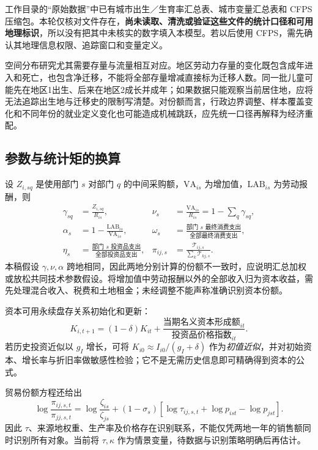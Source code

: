 \documentclass[UTF8,a4paper,zihao=-4,fontset=windows]{ctexart}
\numberwithin{equation}{section}
\begin{document}
工作目录的“原始数据”中已有城市出生／生育率汇总表、城市变量汇总表和 CFPS 压缩包。本轮仅核对文件存在，\textbf{尚未读取、清洗或验证这些文件的统计口径和可用地理标识}，所以没有把其中未核实的数字填入本模型。若以后使用 CFPS，需先确认其地理信息权限、追踪窗口和变量定义。

空间分布研究尤其需要存量与流量相互对应。地区劳动力存量的变化既包含成年进入和死亡，也包含净迁移，不能将全部存量增减直接标为迁移人数。同一批儿童可能先在地区1出生、后来在地区2成长并成年；如果数据只能观察当前居住地，应将无法追踪出生地与迁移史的限制写清楚。对份额而言，行政边界调整、样本覆盖变化和不同年份的就业定义变化也可能造成机械跳跃，应先统一口径再解释为经济重配。

\subsection{参数与统计矩的换算}
设 $Z_{i,sq}$ 是使用部门 $s$ 对部门 $q$ 的中间采购额，$\mathrm{VA}_{is}$ 为增加值，$\mathrm{LAB}_{is}$ 为劳动报酬，则
\begin{align}
 \gamma_{sq}&=\frac{Z_{i,sq}}{R_{is}},&
 \nu_s&=\frac{\mathrm{VA}_{is}}{R_{is}}
 =1-\sum_q\gamma_{sq},\\
 \alpha_s&=1-\frac{\mathrm{LAB}_{is}}{\mathrm{VA}_{is}},&
 \omega_s&=\frac{\text{部门 }s\text{ 最终消费支出}}{\text{全部最终消费支出}},\\
 \eta_s&=\frac{\text{部门 }s\text{ 投资品支出}}{\text{全部投资品支出}},&
 \pi_{ij,s}&=\frac{\mathcal T_{ij,s}}{\sum_k\mathcal T_{kj,s}}.
 \label{eq:calibration}
\end{align}
本稿假设 $\gamma,\nu,\alpha$ 跨地相同，因此两地分别计算的份额不一致时，应说明汇总加权或放松共同技术参数假设。将增加值中劳动报酬以外的全部收入归为资本收益，需先处理混合收入、税费和土地租金；未经调整不能声称准确识别资本份额。

资本可用永续盘存关系初始化和更新：
\begin{equation}
 K_{i,t+1}=(1-\delta)K_{it}
 +\frac{\text{当期名义资本形成额}_{it}}{\text{投资品价格指数}_{it}}.
\end{equation}
若历史投资近似以 $g_I$ 增长，可将 $K_{i0}\approx I_{i0}/(g_I+\delta)$ 作为\emph{初值近似}，并对初始资本、增长率与折旧率做敏感性检验；它不是无需历史信息即可精确得到资本的公式。

贸易份额方程还给出
\begin{equation}
 \log\frac{\pi_{ij,s,t}}{\pi_{jj,s,t}}
 =\log\frac{\zeta_{is}}{\zeta_{js}}
 +(1-\sigma_s)\left[\log\tau_{ij,s,t}+\log p_{ist}-\log p_{jst}\right].
 \label{eq:trade-identification}
\end{equation}
因此 $\tau$、来源地权重、生产率及价格存在识别联系，不能仅凭两地一年的销售额同时识别所有对象。当前将 $\tau,\kappa$ 作为情景变量，待数据与识别策略明确后再估计。
\end{document}
